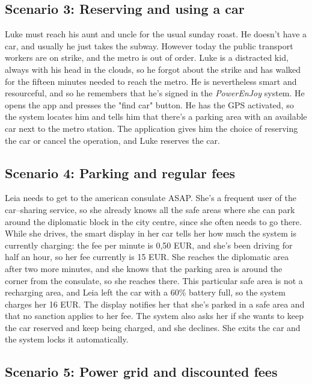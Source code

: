 \subsection{Scenario 3: Reserving and using a car}
	Luke must reach his aunt and uncle for the usual sunday roast. He doesn't have a car, and usually he just takes the subway. However today the public transport workers are on strike, and the metro is out of order. Luke is a distracted kid, always with his head in the clouds, so he forgot about the strike and has walked for the fifteen minutes needed to reach the metro. He is nevertheless smart and resourceful, and so he remembers that he's signed in the \textit{PowerEnJoy} system. He opens the app and presses the "find car" button. He has the GPS activated, so the system locates him and tells him that there's a parking area with an available car next to the metro station. The application gives him the choice of reserving the car or cancel the operation, and Luke reserves the car. 
	
\subsection{Scenario 4: Parking and regular fees}
	Leia needs to get to the american consulate ASAP. She's a frequent user of the car–sharing service, so she already knows all the safe areas where she can park around the diplomatic block in the city centre, since she often needs to go there. While she drives, the smart display in her car tells her how much the system is currently charging: the fee per minute is 0,50 EUR, and she's been driving for half an hour, so her fee currently is 15 EUR. She reaches the diplomatic area after two more minutes, and she knows that the parking area is around the corner from the consulate, so she reaches there. This particular safe area is not a recharging area, and Leia left the car with a 60\% battery full, so the system charges her 16 EUR. The display notifies her that she's parked in a safe area and that no sanction applies to her fee. The system also asks her if she wants to keep the car reserved and keep being charged, and she declines. She exits the car and the system locks it automatically. 
	
\subsection{Scenario 5: Power grid and discounted fees}
	

